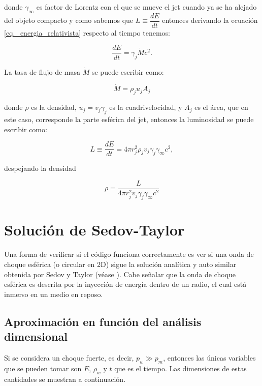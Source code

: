\documentclass[12pt,a4paper]{book}
\begin{document}
\noindent donde $\gamma_{\infty}$ es factor de Lorentz con el que se mueve el jet cuando ya se ha alejado del objeto compacto y como sabemos 
que $L \equiv \dfrac{d E}{d t}$ entonces derivando la ecuación \ref{eq._energia_relativista} respecto al tiempo tenemos:

\begin{equation} \label{eq._luminosidad_relativista}
  \dfrac{d E}{d t} = \gamma_{j} \dot{ M }  c^2.
\end{equation}

La tasa de flujo de masa $\dot{M}$ se puede escribir como:

\begin{equation}
  \dot{M} = \rho_j u_j A_j
\end{equation}

\noindent donde $\rho$ es la densidad, $u_j = v_j \gamma_{j}$ es la cuadrivelocidad,  y $A_j$ es el área, que en este caso, corresponde la parte esférica del jet, entonces la luminosidad se puede escribir como:

\begin{equation}
  L \equiv \dfrac{d E}{d t} = 4\pi r_j^2 \rho_j v_j \gamma_j \gamma_{\infty} c^2,
\end{equation}

\noindent despejando la densidad

\begin{equation}
  \rho = \frac{L}{4\pi r_j^2 v_j \gamma_j \gamma_{\infty} c^2}
\end{equation}



\section{Solución de Sedov-Taylor} \label{sec:sedov_taylor}

Una forma de verificar si el código funciona correctamente es ver si una onda de choque esférica (o circular en 2D) sigue la solución analítica y auto similar obtenida por Sedov y Taylor (véase \citet{PAFD}). 
Cabe señalar que la onda de choque esférica es descrita por la inyección de energía dentro de un radio, el cual está inmerso en un medio en reposo. 

\subsection{Aproximación en función del análisis dimensional}
Si se considera un choque fuerte,
es decir, $p_w \gg p_m$,
entonces las únicas variables que se pueden tomar son $E$, $\rho_w$ y $t$ que es el tiempo.
Las dimensiones de estas cantidades se muestran a continuación. 
\end{document}
